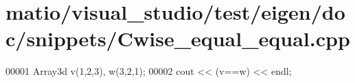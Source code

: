 \hypertarget{matio_2visual__studio_2test_2eigen_2doc_2snippets_2_cwise__equal__equal_8cpp_source}{}\section{matio/visual\+\_\+studio/test/eigen/doc/snippets/\+Cwise\+\_\+equal\+\_\+equal.cpp}
\label{matio_2visual__studio_2test_2eigen_2doc_2snippets_2_cwise__equal__equal_8cpp_source}

\begin{DoxyCode}
00001 Array3d v(1,2,3), w(3,2,1);
00002 cout << (v==w) << endl;
\end{DoxyCode}
